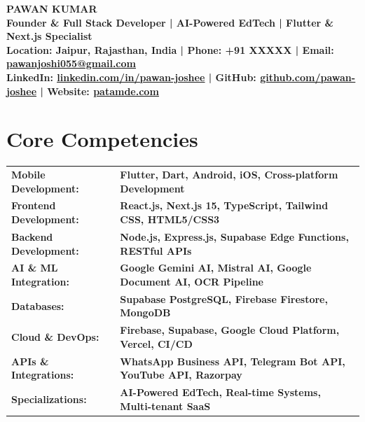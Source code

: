\documentclass[letterpaper,11pt]{article}
\renewcommand{\textbf}[1]{{\bfseries\color{headingblack}#1}}
\begin{document}
\color{textblack}

\begin{center}
    {\color{headingblack}\Huge\bfseries PAWAN KUMAR} \\ \vspace{1pt}
    {\color{textblack}\large\bfseries Founder \& Full Stack Developer | AI-Powered EdTech | Flutter \& Next.js Specialist} \\ \vspace{2pt}
    \bfseries\color{textblack}\small{
    Location: Jaipur, Rajasthan, India | 
    Phone: +91 XXXXX |
    Email: \href{mailto:pawanjoshi055@gmail.com}{\color{linkblue}\underline{pawanjoshi055@gmail.com}}}
    \\ \vspace{1pt}
    \bfseries\color{textblack}\small{
    LinkedIn: \href{https://www.linkedin.com/in/pawan-joshee/}{\color{linkblue}\underline{linkedin.com/in/pawan-joshee}} |
    GitHub: \href{https://github.com/pawan-joshee}{\color{linkblue}\underline{github.com/pawan-joshee}} |
    Website: \href{https://patamde.com}{\color{linkblue}\underline{patamde.com}}}
\end{center}

\section{Core Competencies}
\begin{tabular*}{\textwidth}{@{\extracolsep{\fill}}ll}
\textbf{Mobile Development:} & \bfseries\color{textblack}Flutter, Dart, Android, iOS, Cross-platform Development \\
\textbf{Frontend Development:} & \bfseries\color{textblack}React.js, Next.js 15, TypeScript, Tailwind CSS, HTML5/CSS3 \\
\textbf{Backend Development:} & \bfseries\color{textblack}Node.js, Express.js, Supabase Edge Functions, RESTful APIs \\
\textbf{AI \& ML Integration:} & \bfseries\color{textblack}Google Gemini AI, Mistral AI, Google Document AI, OCR Pipeline \\
\textbf{Databases:} & \bfseries\color{textblack}Supabase PostgreSQL, Firebase Firestore, MongoDB \\
\textbf{Cloud \& DevOps:} & \bfseries\color{textblack}Firebase, Supabase, Google Cloud Platform, Vercel, CI/CD \\
\textbf{APIs \& Integrations:} & \bfseries\color{textblack}WhatsApp Business API, Telegram Bot API, YouTube API, Razorpay \\
\textbf{Specializations:} & \bfseries\color{textblack}AI-Powered EdTech, Real-time Systems, Multi-tenant SaaS
\end{tabular*}
\end{document}

